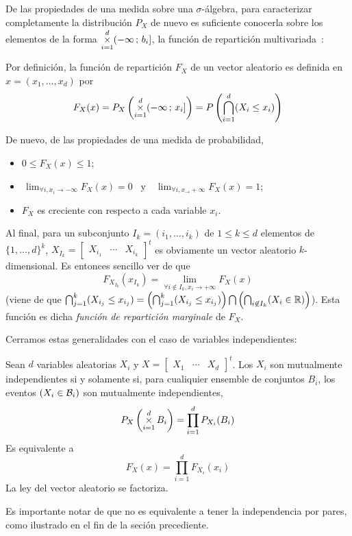 De las propiedades de una medida sobre una $\sigma$-\'algebra, para caracterizar
completamente la distribuci\'on $P_X$ de nuevo es suficiente conocerla sobre los
elementos de  la forma $\displaystyle  \operatorname*{\times}_{i=1}^d (-\infty \, ;  \, b_i]$,
\ie  la funci\'on  de repartici\'on  multivariada~\cite{AthLah06,  Coh13, Bre88,
  HogMck13}:
%
\begin{definicion}
  Por  definici\'on,  la  funci\'on  de  repartici\'on  $F_X$  de  un vector
  aleatorio es definida en $x = (x_1 , \ldots , x_d)$ por
  \[
  F_X(x) =  P_X\left( \operatorname*{\times}_{i=1}^d (-\infty \,  ; \, x_i]  \right) = P\left(
    \bigcap_{i=1}^d (X_i \le x_i) \right)
  \]
\end{definicion}
%
De nuevo, de las propiedades de una medida de probabilidad,
%
\begin{itemize}
\item $0 \le F_X(x) \le 1$;
%
\item $\displaystyle  \, \lim_{\forall  i, x_i \to  -\infty} F_X(x)  = 0$ \  y \
  $\displaystyle \, \lim_{\forall i, x_ \to +\infty} F_X(x) = 1$;
%
\item $F_X$ es creciente con respecto a cada variable $x_i$.
\end{itemize}
%
Al  final, para  un subconjunto  $I_k =  (i_1,\ldots,i_k)$ de  $1 \le  k  \le d$
elementos de  $\{ 1  , \ldots ,  d \}^k$,  $X_{I_k} = \begin{bmatrix}  X_{i_1} &
  \cdots   &   X_{i_k}\end{bmatrix}^t$  es   obviamente   un  vector   aleatorio
$k$-dimensional. Es entonces sencillo ver de que
%
\[
F_{X_{I_k}}(x_{I_k}) = \lim_{\forall i \not\in I_k, x_i \to +\infty} F_X(x)
\label{pagina:MP:MarginalesF}
\]
%
(viene de  que $\bigcap_{j=1}^k (X_{i_j}  \le x_{i_j}) =  \left( \bigcap_{j=1}^k
  (X_{i_j} \le x_{i_j}) \right) \bigcap  \left( \bigcap_{i \not\in I_k} (X_i \in
  \mathbb{R})  \right)$). Esta  funci\'on es  dicha {\it  funci\'on  de repartici\'on
  marginale} de $F_X$.

Cerramos estas generalidades con el caso de variables independientes:
%
\begin{definicion}[Independencia]
  Sean $d$  variables aleatorias  $X_i$ y  $X = \begin{bmatrix}  X_1 &  \cdots &
    X_d  \end{bmatrix}^t$.   Los  $X_i$  son  mutualmente  independientes  si  y
  solamente si, para  cualiquier ensemble de conjuntos $B_i$,  los eventos $(X_i
  \in \mathcal{B}_i)$ son mutualmente independientes, \ie
  \[
  P_X\left( \operatorname*{\times}_{i=1}^d B_i \right) = \prod_{i=1}^d P_{X_i}(B_i)
  \]
  Es equivalente a
  \[
  F_X(x) = \prod_{i=1}^d F_{X_i}(x_i)
  \]
  La ley del vector aleatorio se factoriza.
\end{definicion}
%
Es importante notar de que no es equivalente a tener la independencia por pares,
como ilustrado en el fin de la seci\'on precediente.

